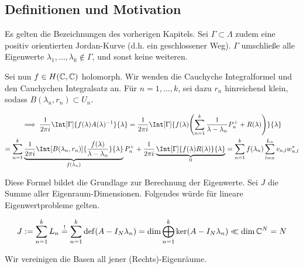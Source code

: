 \subsection*{Definitionen und Motivation}

Es gelten die Bezeichnungen des vorherigen Kapitels.
Sei $\Gamma \subset \Lambda$ zudem eine positiv orientierten Jordan-Kurve (d.h. ein geschlossener Weg).
$\Gamma$ umschließe alle Eigenwerte $\lambda_1, \dots, \lambda_k \not \in \Gamma$, und sonst keine weiteren.



Sei nun $f \in H(\mathbb{C}, \mathbb{C})$ holomorph.
Wir wenden die Cauchyche Integralformel und den Cauchychen Integralsatz an.
Für $n = 1, \dots, k$, sei dazu $r_n$ hinreichend klein, sodass $B(\lambda_n, r_n) \subset U_n$.

\begin{multline*}
    \implies
    \frac{1}{2 \pi i}
    \Int[\Gamma]
    {
        f(\lambda) A(\lambda)^{-1}
    }{\lambda}
    =
    \frac{1}{2 \pi i}
    \Int[\Gamma]
    {
        f(\lambda)
        \pbraces
        {
            \sum_{n=1}^k
                \frac{1}{\lambda - \lambda_n} P_n^+
                +
                R(\lambda)
        }
    }{\lambda} \\
    =
    \sum_{n=1}^k
        \underbrace
        {
            \frac{1}{2 \pi i}
            \Int[B(\lambda_n, r_n)]
            {
                \frac{f(\lambda)}{\lambda - \lambda_n}
            }{\lambda}
        }_{f(\lambda_n)}
        P_n^+
    +
    \frac{1}{2 \pi i}
    \underbrace
    {
        \Int[\Gamma]
        {
            f(\lambda) R(\lambda)
        }{\lambda}
    }_0
    =
    \sum_{n=1}^k
        f(\lambda_n)
        \sum_{l=n}^{L_n}
            v_{n, l} w_{n, l}^\ast
\end{multline*}

Diese Formel bildet die Grundlage zur Berechnung der Eigenwerte.
Sei $J$ die Summe aller Eigenraum-Dimensionen.
Folgendes würde für lineare Eigenwertprobleme gelten.

\begin{align*}
    J
    :=
    \sum_{n=1}^k
        L_n
    \stackrel{!}{=}
    \sum_{n=1}^k
        \operatorname{def}(A - I_N \lambda_n)
    =
    \dim
    \bigoplus_{n=1}^k
        \ker (A - I_N \lambda_n)
    \ll
    \dim \mathbb{C}^N
    =
    N
\end{align*}

Wir vereinigen die Basen all jener (Rechts)-Eigenräume.

